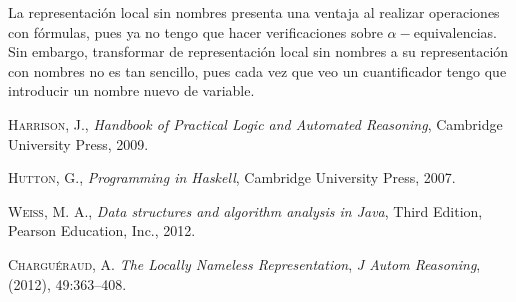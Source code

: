 \documentclass{article}
\begin{document}
La representación local sin nombres presenta una ventaja al realizar operaciones con fórmulas, pues ya no tengo que hacer verificaciones sobre $\alpha-$equivalencias. Sin embargo, transformar de representación local sin nombres a su representación con nombres no es tan sencillo, pues cada vez que veo un cuantificador tengo que introducir un nombre nuevo de variable.

\newpage


\begin{thebibliography}{10}

 \textsc{Harrison, J.}, \textit{Handbook of Practical Logic and Automated Reasoning}, Cambridge University Press, 2009.

 \textsc{Hutton, G.}, \textit{Programming in Haskell}, Cambridge University Press, 2007.

 \textsc{Weiss, M. A.}, \textit{Data structures and algorithm analysis in Java}, Third Edition, Pearson Education, Inc., 2012.

 \textsc{Charguéraud, A.} \textit{The Locally Nameless Representation}, \textit{J Autom Reasoning}, (2012), 49:363–408.

\end{thebibliography}
\end{document}
